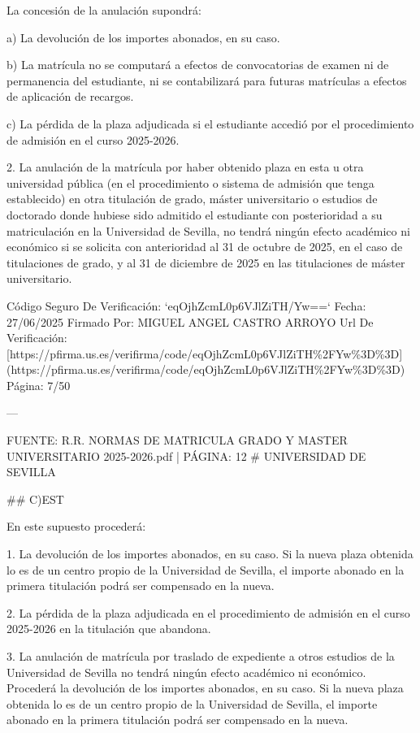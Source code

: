 \documentclass{article}
\begin{document}
\begin{itemize}
\begin{itemize}
\begin{scriptsize}
                  La concesión de la anulación supondrá:

                  a) La devolución de los importes abonados, en su caso.

                  b) La matrícula no se computará a efectos de convocatorias de examen ni de permanencia del estudiante, ni se contabilizará para futuras matrículas a efectos de aplicación de recargos.

                  c) La pérdida de la plaza adjudicada si el estudiante accedió por el procedimiento de admisión en el curso 2025-2026.

                  2. La anulación de la matrícula por haber obtenido plaza en esta u otra universidad pública (en el procedimiento o sistema de admisión que tenga establecido) en otra titulación de grado, máster universitario o estudios de doctorado donde hubiese sido admitido el estudiante con posterioridad a su matriculación en la Universidad de Sevilla, no tendrá ningún efecto académico ni económico si se solicita con anterioridad al 31 de octubre de 2025, en el caso de titulaciones de grado, y al 31 de diciembre de 2025 en las titulaciones de máster universitario.

                  Código Seguro De Verificación: `eqOjhZcmL0p6VJlZiTH/Yw==`
                  Fecha: 27/06/2025
                  Firmado Por: MIGUEL ANGEL CASTRO ARROYO
                  Url De Verificación: [https://pfirma.us.es/verifirma/code/eqOjhZcmL0p6VJlZiTH\%2FYw\%3D\%3D](https://pfirma.us.es/verifirma/code/eqOjhZcmL0p6VJlZiTH\%2FYw\%3D\%3D)
                  Página: 7/50

                  ---

                  FUENTE: R.R. NORMAS DE MATRICULA GRADO Y MASTER UNIVERSITARIO 2025-2026.pdf | PÁGINA: 12
                  \# UNIVERSIDAD DE SEVILLA

                  \#\# C)EST

                  En este supuesto procederá:

                  1. La devolución de los importes abonados, en su caso. Si la nueva plaza obtenida lo es de un centro propio de la Universidad de Sevilla, el importe abonado en la primera titulación podrá ser compensado en la nueva.

                  2. La pérdida de la plaza adjudicada en el procedimiento de admisión en el curso 2025-2026 en la titulación que abandona.

                  3. La anulación de matrícula por traslado de expediente a otros estudios de la Universidad de Sevilla no tendrá ningún efecto académico ni económico. Procederá la devolución de los importes abonados, en su caso. Si la nueva plaza obtenida lo es de un centro propio de la Universidad de Sevilla, el importe abonado en la primera titulación podrá ser compensado en la nueva.


\end{scriptsize}
\end{itemize}
\end{itemize}
\end{document}
